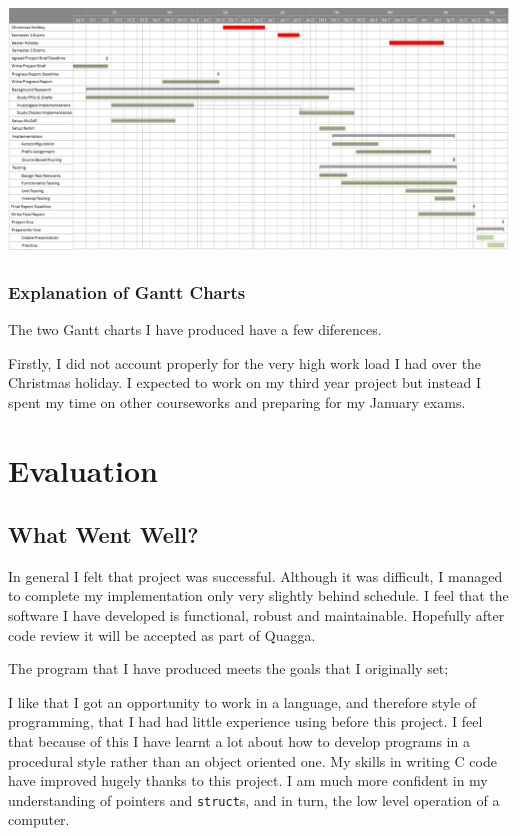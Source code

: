 \documentclass[12pt]{report}
\begin{document}
\begin{landscape}
\begin{center}
  \hspace*{-0.75cm}
  \includegraphics[width=1.105\linewidth]{../Gantt/EvenBetterApril.png}
\end{center}

\end{landscape}

\pagebreak

\subsection{Explanation of Gantt Charts}
The two Gantt charts I have produced have a few diferences.

Firstly, I did not account properly for the very high work load I had over the
Christmas holiday. I expected to work on my third year project but
instead I spent my time on other courseworks and preparing for my
January exams. 



\chapter{Evaluation}

\section{What Went Well?}
In general I felt that project was successful. Although it was difficult, I
managed to complete my implementation only very slightly behind schedule. I
feel that the software I have developed is functional, robust and maintainable.
Hopefully after code review it will be accepted as part of Quagga.

The program that I have produced meets the goals that I originally set; 

I like that I got an opportunity to work in a language, and therefore style of
programming, that I had had little experience using before this project.  I
feel that because of this I have learnt a lot about how to develop programs in
a procedural style rather than an object oriented one. My skills in writing C
code have improved hugely thanks to this project. I am much more confident in
my understanding of pointers and \texttt{struct}s, and in turn, the low level
operation of a computer.  
\end{document}
